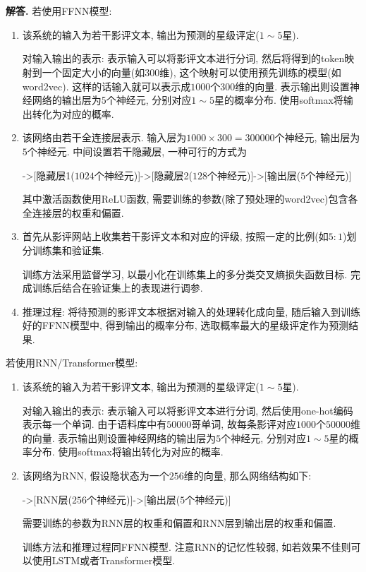 \documentclass[11pt]{article}
\newenvironment{solution}{\par\noindent\textbf{解答. }}{\par}
\begin{document}
	\section{}
	\begin{solution}
		若使用FFNN模型:
		\begin{enumerate}[(1)]
			\item 该系统的输入为若干影评文本, 输出为预测的星级评定($1\sim 5$星).
			
			对输入输出的表示: 表示输入可以将影评文本进行分词, 然后将得到的token映射到一个固定大小的向量(如$300$维), 这个映射可以使用预先训练的模型(如word2vec). 这样的话输入就可以表示成$1000$个$300$维的向量. 表示输出则设置神经网络的输出层为$5$个神经元, 分别对应$1\sim 5$星的概率分布. 使用softmax将输出转化为对应的概率.

			\item 该网络由若干全连接层表示. 输入层为$1000\times 300=300000$个神经元, 输出层为$5$个神经元. 中间设置若干隐藏层, 一种可行的方式为
			\begin{center}
				->[隐藏层1($1024$个神经元)]->[隐藏层2($128$个神经元)]->[输出层($5$个神经元)]
			\end{center}

			其中激活函数使用ReLU函数, 需要训练的参数(除了预处理的word2vec)包含各全连接层的权重和偏置.

			\item 首先从影评网站上收集若干影评文本和对应的评级, 按照一定的比例(如$5:1$)划分训练集和验证集. 
			
			训练方法采用监督学习, 以最小化在训练集上的多分类交叉熵损失函数目标. 完成训练后结合在验证集上的表现进行调参.

			\item 推理过程: 将待预测的影评文本根据对输入的处理转化成向量, 随后输入到训练好的FFNN模型中, 得到输出的概率分布, 选取概率最大的星级评定作为预测结果.
		\end{enumerate}

		若使用RNN/Transformer模型:
		\begin{enumerate}[(1)]
			\item 该系统的输入为若干影评文本, 输出为预测的星级评定($1\sim 5$星).
			
			对输入输出的表示: 表示输入可以将影评文本进行分词, 然后使用one-hot编码表示每一个单词. 由于语料库中有$50000$哥单词, 故每条影评对应$1000$个$50000$维的向量. 表示输出则设置神经网络的输出层为$5$个神经元, 分别对应$1\sim 5$星的概率分布. 使用softmax将输出转化为对应的概率.

			\item 该网络为RNN, 假设隐状态为一个$256$维的向量, 那么网络结构如下: 
			\begin{center}
				->[RNN层($256$个神经元)]->[输出层($5$个神经元)]
			\end{center}
			需要训练的参数为RNN层的权重和偏置和RNN层到输出层的权重和偏置.

			训练方法和推理过程同FFNN模型. 注意RNN的记忆性较弱, 如若效果不佳则可以使用LSTM或者Transformer模型.
		\end{enumerate}
	\end{solution}
\end{document}
